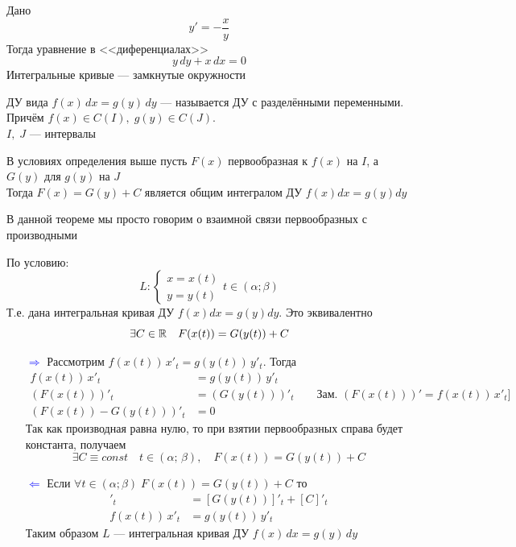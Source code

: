 \begin{Example}
    Дано
    \[
        y' = -\frac{x}{y}
    \]
    Тогда уравнение в <<диференциалах>>
    \[
        y\,dy + x\,dx = 0
    \]
    Интегральные кривые --- замкнутые окружности
\end{Example}

\begin{Def}
    ДУ вида $f(x)\,dx = g(y)\,dy$ --- называется ДУ с разделёнными переменными. Причём $f(x) \in C(I),\; g(y) \in C(J)$.\\ $I,\; J$ --- интервалы
\end{Def}

\begin{Th}
    В условиях определения выше пусть $F(x)$ первообразная к $f(x)$ на $I$, а $G(y)$ для $g(y)$ на $J$\\
    Тогда $F(x) = G(y) + C$ является общим интегралом ДУ $f(x)dx = g(y)dy$
\end{Th}
\begin{Note}
    В данной теореме мы просто говорим о взаимной связи первообразных с производными
\end{Note}
\begin{Proof}
    По условию:
    \[
        L: \begin{cases}
           x = x(t)\\
           y = y(t) 
        \end{cases} t \in (\alpha; \beta)
    \]
    Т.е. дана интегральная кривая ДУ $f(x)dx = g(y)dy$. Это эквивалентно
    \[
        \exists C \in \mathbb{R} \quad F(x(t)) = G(y(t)) + C    
    \]
    \begin{enumerate}
        \item [\textcolor{blue}{$\Rightarrow$}] Рассмотрим $f(x(t))\,x'_t = g(y(t))\,y'_t$. Тогда
        \begin{align*}
            f(x(t))\,x'_t &= g(y(t))\,y'_t\\
            (F(x(t)))'_t &= (G(y(t)))'_t \qquad  \text{Зам. }(F(x(t)))' = f(x(t))\,x'_t]\\
            (F(x(t)) - G(y(t)))'_t &= 0
        \end{align*}
        Так как производная равна нулю, то при взятии первообразных справа будет константа, получаем
        \[
            \exists C \equiv const \quad t \in (\alpha;\, \beta), \quad F(x(t)) = G(y(t)) + C
        \]
        
        \item[\textcolor{blue}{$\Leftarrow$}] Если $\forall t \in (\alpha; \beta) \; F(x(t)) = G(y(t)) + C$ то
        \begin{align*}
            [F(x(t))]'_t &= [G(y(t))]'_t + [C]'_t\\
            f(x(t))\,x'_t &= g(y(t))\,y'_t
        \end{align*}
        Таким образом $L$ --- интегральная кривая ДУ $f(x)\,dx = g(y)\,dy$
    \end{enumerate}
\end{Proof}

